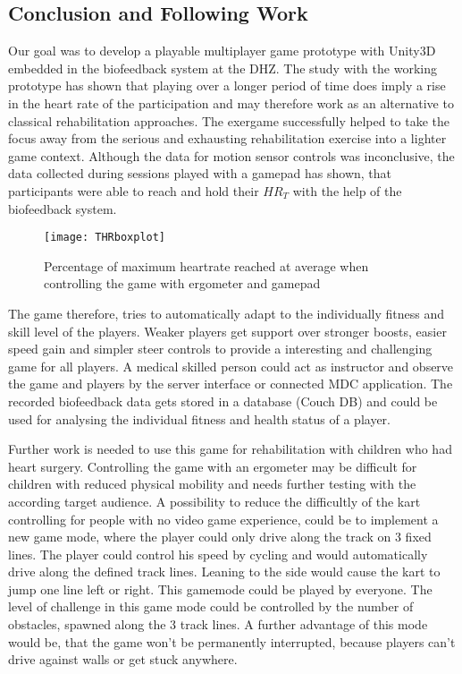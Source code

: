 \begin{multicols}{2}
\section{Conclusion and Following Work}
Our goal was to develop a playable multiplayer game prototype with Unity3D embedded in the biofeedback system at the DHZ. The study with the working prototype has shown that playing over a longer period of time does imply a rise in the heart rate of the participation and may therefore work as an alternative to classical rehabilitation approaches. The exergame successfully helped to take the focus away from the serious and exhausting rehabilitation exercise into a lighter game context. Although the data for motion sensor controls was inconclusive, the data collected during sessions played with a gamepad has shown, that participants were able to reach and hold their $HR_T$ with the help of the biofeedback system.
\begin{figure}[H]
  \centering
    \texttt{[image: THRboxplot]}
 \caption{Percentage of maximum heartrate reached at average when controlling the game with ergometer and gamepad}
\end{figure}
The game therefore, tries to automatically adapt to the individually fitness and skill level of the players. Weaker players get support over stronger boosts, easier speed gain and simpler steer controls to provide a interesting and challenging game for all players. A medical skilled person could act as instructor and observe the game and players by the server interface or connected MDC application. The recorded biofeedback data gets stored in a database (Couch DB) and could be used for analysing the individual fitness and health status of a player.

Further work is needed to use this game for rehabilitation with children who had heart surgery. Controlling the game with an ergometer may be difficult for children with reduced physical mobility and needs further testing with the according target audience. A possibility to reduce the difficultly of the kart controlling for people with no video game experience, could be to implement a new game mode, where the player could only drive along the track on 3 fixed lines. The player could control his speed by cycling and would automatically drive along the defined track lines. Leaning to the side would cause the kart to jump one line left or right. This gamemode could be played by everyone. The level of challenge in this game mode could be controlled by the number of obstacles, spawned along the 3 track lines. A further advantage of this mode would be, that the game won't be permanently interrupted, because players can't drive against walls or get stuck anywhere.


\end{multicols}
